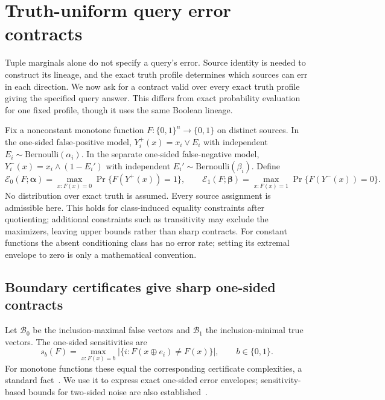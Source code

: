 \documentclass[../main.tex]{subfiles}
\begin{document}
\section{Truth-uniform query error contracts}
\label{sec:query_contracts}
Tuple marginals alone do not specify a query's error. Source identity is
needed to construct its lineage, and the exact truth profile determines
which sources can err in each direction. We now ask for a contract valid
over every exact truth profile giving the specified query answer. This
differs from exact probability evaluation for one fixed profile, though it
uses the same Boolean lineage.

Fix a nonconstant monotone function $F:\{0,1\}^n\to\{0,1\}$ on distinct
sources. In the one-sided false-positive model,
$Y_i^+(x)=x_i\lor E_i$ with independent $E_i\sim\mathrm{Bernoulli}(\alpha_i)$.
In the separate one-sided false-negative model,
$Y_i^-(x)=x_i\land(1-E_i')$ with independent
$E_i'\sim\mathrm{Bernoulli}(\beta_i)$. Define
\[
 \mathcal E_0(F;\boldsymbol\alpha)
 =\max_{x:F(x)=0}\Pr\{F(Y^+(x))=1\},\qquad
 \mathcal E_1(F;\boldsymbol\beta)
 =\max_{x:F(x)=1}\Pr\{F(Y^-(x))=0\}.
\]
No distribution over exact truth is assumed. Every source assignment is
admissible here. This holds for class-induced equality constraints after
quotienting; additional constraints such as transitivity may exclude the
maximizers, leaving upper bounds rather than sharp contracts. For constant
functions the absent conditioning class has no error rate; setting its
extremal envelope to zero is only a mathematical convention.

\subsection{Boundary certificates give sharp one-sided contracts}
Let $\mathcal B_0$ be the inclusion-maximal false vectors and
$\mathcal B_1$ the inclusion-minimal true vectors. The one-sided sensitivities are
\[
 s_b(F)=\max_{x:F(x)=b}|\{i:F(x\mathbin\oplus e_i)\ne F(x)\}|,
 \qquad b\in\{0,1\}.
\]
For monotone functions these equal the corresponding certificate
complexities, a standard fact~\cite{blanc2022counterfactuals}. We use it to
express exact one-sided error envelopes; sensitivity-based bounds for
two-sided noise are also established~\cite[Lemma~15]{gopalan2016smooth}.
\end{document}
